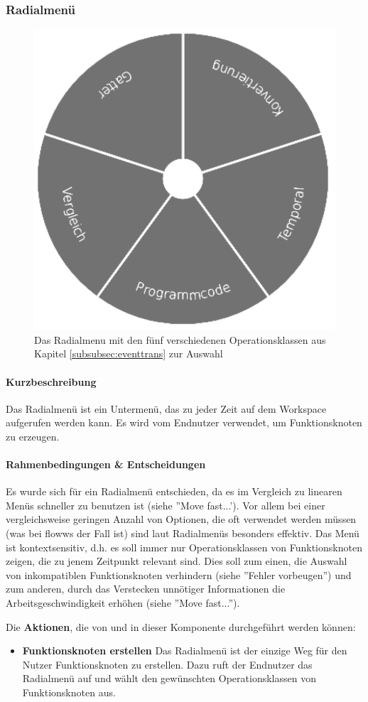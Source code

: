 \subsubsection{Radialmenü}

\begin{figure}[h]
  \centering
  \includegraphics[width=.4\textwidth]{bilder/chapter4/chapter4_3/radialmenu.pdf}
  \caption{Das Radialmenu mit den fünf verschiedenen Operationsklassen aus Kapitel \ref{subsubsec:eventtrans} zur Auswahl}
  \label{fig:radialmenu}
\end{figure}

\paragraph{Kurzbeschreibung} Das Radialmenü ist ein Untermenü, das zu jeder Zeit auf dem Workspace aufgerufen werden kann. Es wird vom Endnutzer verwendet, um Funktionsknoten zu erzeugen.

\paragraph{Rahmenbedingungen \& Entscheidungen} Es wurde sich für ein Radialmenü entschieden, da es im Vergleich zu linearen Menüs schneller zu benutzen ist (siehe ''Move fast...'). Vor allem bei einer vergleichsweise geringen Anzahl von Optionen, die oft verwendet werden müssen (was bei flowws der Fall ist) sind laut \cite{kurtenbach1994user} Radialmenüs besonders effektiv. Das Menü ist kontextsensitiv, d.h. es soll immer nur Operationsklassen von Funktionsknoten zeigen, die zu jenem Zeitpunkt relevant sind. Dies soll zum einen, die Auswahl von inkompatiblen Funktionsknoten verhindern (siehe ''Fehler vorbeugen'') und zum anderen, durch das Verstecken unnötiger Informationen die Arbeitsgeschwindigkeit erhöhen (siehe ''Move fast...'').

Die \textbf{Aktionen}, die von und in dieser Komponente durchgeführt werden können: 
\begin{itemize}
    \item \textbf{Funktionsknoten erstellen} Das Radialmenü ist der einzige Weg für den Nutzer Funktionsknoten zu erstellen. Dazu ruft der Endnutzer das Radialmenü auf und wählt den gewünschten Operationsklassen von Funktionsknoten aus.
\end{itemize}

